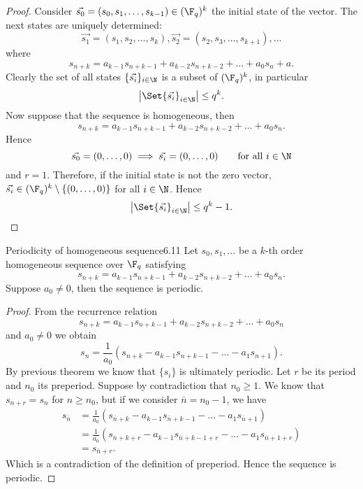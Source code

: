 \begin{proof}
	Consider \(\vec{s_0}=(s_0,s_1,\ldots,s_{k-1}) \in (\F_q)^k\) the initial state of the vector. The next states are uniquely determined:
	\[
		\vec{s_1} = (s_1, s_2, \ldots, s_k), \vec{s_2} = (s_2,s_3,\ldots,s_{k+1}),\ldots
	\]
	where
	\[
		s_{n+k} = a_{k-1}s_{n+k-1} + a_{k-2}s_{n+k-2} + \ldots + a_0 s_n + a.
	\]
	Clearly the set of all states \(\{\vec{s_i}\}_{i\in\N}\) is a subset of \((\F_q)^k\), in particular
	\[
		\big\lvert\Set{\vec{s_i}}_{i\in\N}\big\rvert \le q^k.
	\]
	Now suppose that the sequence is homogeneous, then
	\[
		s_{n+k} = a_{k-1}s_{n+k-1} + a_{k-2}s_{n+k-2} + \ldots + a_0 s_n.
	\]
	Hence
	\[
		\vec{s_0} = (0,\ldots,0) \implies \vec{s_i} = (0,\ldots,0) \qquad\text{for all }i \in \N
	\]
	and \(r=1\). Therefore, if the initial state is not the zero vector, \(\vec{s_i} \in (\F_q)^k \setminus \{(0,\ldots,0)\}\) for all \(i\in\N\). Hence
	\[
		\big\lvert\Set{\vec{s_i}}_{i\in\N}\big\rvert \le q^k-1.\qedhere
	\]
\end{proof}

\begin{teor}{Periodicity of homogeneous sequence}{6.11}
	Let \(s_0,s_1,\ldots\) be a \(k\)-th order homogeneous sequence over \(\F_q\) satisfying
	\[
		s_{n+k} = a_{k-1}s_{n+k-1} + a_{k-2}s_{n+k-2} + \ldots + a_0 s_n.
	\]
	Suppose \(a_0 \neq 0\), then the sequence is periodic.
\end{teor}

\begin{proof}
	From the recurrence relation
	\[
		s_{n+k} = a_{k-1}s_{n+k-1} + a_{k-2}s_{n+k-2} + \ldots + a_0 s_n
	\]
	and \(a_0 \neq 0\) we obtain
	\[
		s_n = \frac{1}{a_0}(s_{n+k}-a_{k-1}s_{n+k-1}-\ldots-a_1 s_{n+1}).
	\]
	By previous theorem we know that \(\{s_i\}\) is ultimately periodic. Let \(r\) be its period and \(n_0\) its preperiod. Suppose by contradiction that \(n_0 \ge 1\). We know that \(s_{n+r}=s_n\) for \(n\ge n_0\), but if we consider \(\bar{n}=n_0-1\), we have
	\begin{align*}
		s_{\bar{n}} & = \frac{1}{a_0}(s_{\bar{n}+k}-a_{k-1}s_{\bar{n}+k-1}-\ldots-a_1 s_{\bar{n}+1})       \\
		            & = \frac{1}{a_0}(s_{\bar{n}+k+r}-a_{k-1}s_{\bar{n}+k-1+r}-\ldots-a_1 s_{\bar{n}+1+r}) \\
		            & = s_{\bar{n}+r}.
	\end{align*}
	Which is a contradiction of the definition of preperiod. Hence the sequence is periodic.
\end{proof}

